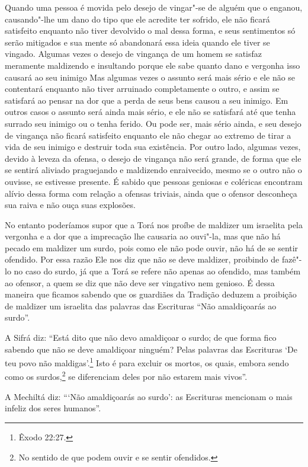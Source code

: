 \begin{multicols}{2}
Quando uma pessoa é movida pelo desejo de vingar"-se de alguém que o
enganou, causando"-lhe um dano do tipo que ele acredite ter sofrido, ele
não ficará satisfeito enquanto não tiver devolvido o mal dessa forma, e
seus sentimentos só serão mitigados e sua mente só abandonará essa ideia
quando ele tiver se vingado. Algumas vezes o desejo de vingança de um
homem se satisfaz meramente maldizendo e insultando porque ele sabe
quanto dano e vergonha isso causará ao seu inimigo Mas algumas vezes o assunto será mais
sério e ele não se contentará enquanto não tiver arruinado completamente
o outro, e assim se satisfará ao pensar na dor que a perda de seus bens
causou a seu inimigo. Em outros casos o assunto será ainda mais sério, e
ele não se satisfará até que tenha surrado seu inimigo ou o tenha
ferido. Ou pode ser, mais sério ainda, e seu desejo de
vingança não ficará satisfeito enquanto ele não chegar ao extremo de
tirar a vida de seu inimigo e destruir toda sua existência. Por outro
lado, algumas vezes, devido à leveza da ofensa, o desejo de vingança não
será grande, de forma que ele se sentirá aliviado praguejando e
maldizendo enraivecido, mesmo se o outro não o ouvisse, se estivesse
presente. É sabido que pessoas geniosas e coléricas encontram alívio
dessa forma com relação a ofensas triviais, ainda que o ofensor
desconheça sua raiva e não ouça suas explosões.

No entanto poderíamos supor que a Torá\starr{} nos proíbe de maldizer um
israelita pela vergonha e a dor que a imprecação lhe causaria ao
ouvi"-la, mas que não há pecado em maldizer um surdo, pois como ele não
pode ouvir, não há de se sentir ofendido. Por essa razão Ele nos diz que
não se deve maldizer, proibindo de fazê"-lo no caso do surdo, já que a
Torá\starr{} se refere não apenas ao ofendido, mas também ao ofensor, a quem se
diz que não deve ser vingativo nem genioso. É dessa maneira que ficamos
sabendo que os guardiães da Tradição deduzem a proibição de maldizer um
israelita das palavras das Escrituras ``Não amaldiçoarás ao surdo''.

A Sifrá\starr{} diz: ``Está dito que não devo amaldiçoar o surdo; de que forma
fico sabendo que não se deve amaldiçoar ninguém? Pelas palavras das
Escrituras `De teu povo não maldigas'.\footnote{Êxodo 22:27.} Isto é para
excluir os mortos, os quais, embora sendo como os
surdos,\footnote{No sentido de que podem ouvir e se sentir ofendidos.} se diferenciam deles por não estarem mais
vivos''.

A Mechiltá\starr{} diz: ```Não amaldiçoarás ao surdo': as Escrituras mencionam
o mais infeliz dos seres humanos''.


\end{multicols}
